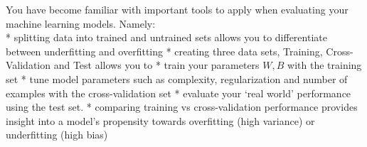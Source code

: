 \documentclass[11pt]{article}
\makeatletter
\newcommand{\boxspacing}{\kern\kvtcb@left@rule\kern\kvtcb@boxsep}
\newcommand{\prompt}[4]{
        \ttfamily\llap{{\color{#2}[#3]:\hspace{3pt}#4}}\vspace{-\baselineskip}
    }
\makeatother
\begin{document}
You have become familiar with important tools to apply when evaluating
your machine learning models. Namely:\\
* splitting data into trained and untrained sets allows you to
differentiate between underfitting and overfitting * creating three data
sets, Training, Cross-Validation and Test allows you to * train your
parameters \(W,B\) with the training set * tune model parameters such as
complexity, regularization and number of examples with the
cross-validation set * evaluate your `real world' performance using the
test set. * comparing training vs cross-validation performance provides
insight into a model's propensity towards overfitting (high variance) or
underfitting (high bias)

    \begin{tcolorbox}[breakable, size=fbox, boxrule=1pt, pad at break*=1mm,colback=cellbackground, colframe=cellborder]
\prompt{In}{incolor}{ }{\boxspacing}
\begin{Verbatim}[commandchars=\\\{\}]

\end{Verbatim}
\end{tcolorbox}


    
    
    
\end{document}
